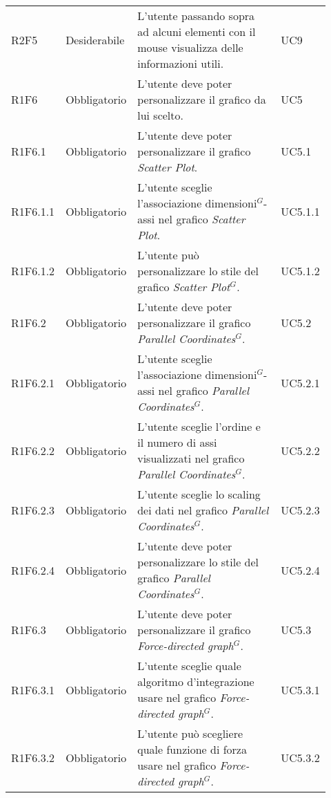 {\begin{longtable}{p{0.12\linewidth}p{0.15\linewidth}p{0.50\linewidth}p{0.15\linewidth}}
    \rowcolor[RGB]{216, 235, 171}
    R2F5 & Desiderabile & L'utente passando sopra ad alcuni elementi con il mouse visualizza delle informazioni utili. & UC9\\
    
    \rowcolor[RGB]{233, 245, 206}
    R1F6 & Obbligatorio & L'utente deve poter personalizzare il grafico da lui scelto. & UC5\\
    \rowcolor[RGB]{216, 235, 171}
    R1F6.1 & Obbligatorio & L'utente deve poter personalizzare il grafico \textit{Scatter Plot}. & UC5.1\\
    \rowcolor[RGB]{233, 245, 206}
    R1F6.1.1 & Obbligatorio & L'utente sceglie l'associazione dimensioni$^{G}$-assi nel grafico \textit{Scatter Plot}. & UC5.1.1\\
    \rowcolor[RGB]{216, 235, 171}
    R1F6.1.2 & Obbligatorio & L'utente può personalizzare lo stile del grafico \textit{Scatter Plot$^{G}$}. & UC5.1.2\\
    \rowcolor[RGB]{233, 245, 206}
    R1F6.2 & Obbligatorio & L'utente deve poter personalizzare il grafico \textit{Parallel Coordinates$^{G}$}. & UC5.2\\
    \rowcolor[RGB]{216, 235, 171}
    R1F6.2.1 & Obbligatorio & L'utente sceglie l'associazione dimensioni$^{G}$-assi nel grafico \textit{Parallel Coordinates$^{G}$}. & UC5.2.1\\
    \rowcolor[RGB]{233, 245, 206}
    R1F6.2.2 & Obbligatorio & L'utente sceglie l'ordine e il numero di assi visualizzati nel grafico \textit{Parallel Coordinates$^{G}$}. & UC5.2.2\\
    \rowcolor[RGB]{216, 235, 171}
    R1F6.2.3 & Obbligatorio & L'utente sceglie lo scaling dei dati nel grafico \textit{Parallel Coordinates$^{G}$}. & UC5.2.3\\
    \rowcolor[RGB]{233, 245, 206}
    R1F6.2.4 & Obbligatorio & L'utente deve poter personalizzare lo stile del grafico \textit{Parallel Coordinates$^{G}$}. & UC5.2.4\\
    \rowcolor[RGB]{216, 235, 171}
    R1F6.3 & Obbligatorio & L'utente deve poter personalizzare il grafico \textit{Force-directed graph$^{G}$}. & UC5.3\\
    \rowcolor[RGB]{233, 245, 206}
    R1F6.3.1 & Obbligatorio & L'utente sceglie quale algoritmo d'integrazione usare nel grafico \textit{Force-directed graph$^{G}$}. & UC5.3.1\\
    \rowcolor[RGB]{216, 235, 171}
    R1F6.3.2 & Obbligatorio & L'utente può scegliere quale funzione di forza usare nel grafico \textit{Force-directed graph$^{G}$}. & UC5.3.2\\

\end{longtable}}
